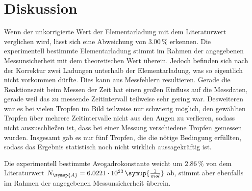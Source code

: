 \section{Diskussion}
\label{sec:Diskussion}

Wenn der unkorrigierte Wert der Elementarladung mit dem Literaturwert verglichen wird, lässt sich eine Abweichung von $3.00 \,\%$ erkennen. Die
experimentell bestimmte Elementarladung stimmt im Rahmen der angegebenen Messunsicherheit mit dem theoretischen Wert überein. Jedoch befinden sich nach der
Korrektur zwei Ladungen unterhalb der Elementarladung, was so eigentlich nicht vorkommen dürfte. Dies kann aus Messfehlern resultieren. Gerade die Reaktionszeit beim Messen der Zeit hat einen großen Einfluss auf die Messdaten, gerade weil
das zu messende Zeitintervall teilweise sehr gering war. Desweiteren war es bei vielen Tropfen im Bild teilweise nur schwierig möglich, den gewählten 
Tropfen über mehrere Zeitintervalle nicht aus den Augen zu verlieren, sodass nicht auszuschließen ist, dass bei einer Messung verschiedene Tropfen 
gemessen wurden. Insgesamt gab es nur fünf Tropfen, die die nötige Bedingung erfüllten, sodass das Ergebnis statistisch noch nicht wirklich aussagekräftig ist.

Die experimentell bestimmte Avogadrokonstante weicht um $2.86\,\%$ von dem Literaturwert $N_{\symup{A}}=6.0221 \cdot10^{23} \,\symup{\frac{1}{mol}}$ 
\cite{avo} ab, stimmt aber ebenfalls im Rahmen der angegebenen Messunsicherheit überein.